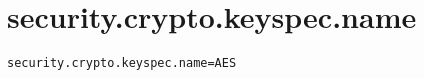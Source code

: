\section{security.crypto.keyspec.name}
\label{configuration:SecurityCryptoKeyspecName}
\ClearAPI
\TODO
{}
\begin{lstlisting}[style=Props,caption={Usage example for \textit{security.crypto.keyspec.name}}]
security.crypto.keyspec.name=AES
\end{lstlisting}